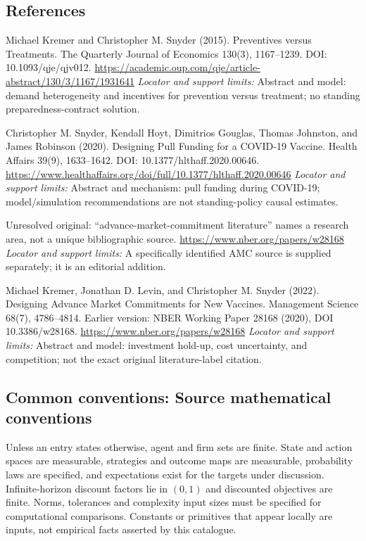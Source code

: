 \documentclass[11pt,a4paper]{article}
\begin{document}
\subsection*{References}
\begin{enumerate}[label={[S\arabic*]},leftmargin=*,itemsep=0.6em]
\item Michael Kremer and Christopher M. Snyder (2015). Preventives versus Treatments. The Quarterly Journal of Economics 130(3), 1167--1239. DOI: 10.1093/qje/qjv012.
\url{https://academic.oup.com/qje/article-abstract/130/3/1167/1931641}
\newline\emph{Locator and support limits:} Abstract and model: demand heterogeneity and incentives for prevention versus treatment; no standing preparedness-contract solution.
\item Christopher M. Snyder, Kendall Hoyt, Dimitrios Gouglas, Thomas Johnston, and James Robinson (2020). Designing Pull Funding for a COVID-19 Vaccine. Health Affairs 39(9), 1633--1642. DOI: 10.1377/hlthaff.2020.00646.
\url{https://www.healthaffairs.org/doi/full/10.1377/hlthaff.2020.00646}
\newline\emph{Locator and support limits:} Abstract and mechanism: pull funding during COVID-19; model/simulation recommendations are not standing-policy causal estimates.
\item Unresolved original: “advance-market-commitment literature” names a research area, not a unique bibliographic source.
\url{https://www.nber.org/papers/w28168}
\newline\emph{Locator and support limits:} A specifically identified AMC source is supplied separately; it is an editorial addition.
\item Michael Kremer, Jonathan D. Levin, and Christopher M. Snyder (2022). Designing Advance Market Commitments for New Vaccines. Management Science 68(7), 4786--4814. Earlier version: NBER Working Paper 28168 (2020), DOI 10.3386/w28168.
\url{https://www.nber.org/papers/w28168}
\newline\emph{Locator and support limits:} Abstract and model: investment hold-up, cost uncertainty, and competition; not the exact original literature-label citation.
\end{enumerate}

\subsection*{Common conventions: Source mathematical conventions}

Unless an entry states otherwise, agent and firm sets are finite. State and action spaces are measurable, strategies and outcome maps are measurable, probability laws are specified, and expectations exist for the targets under discussion. Infinite-horizon discount factors lie in $(0,1)$ and discounted objectives are finite. Norms, tolerances and complexity input sizes must be specified for computational comparisons. Constants or primitives that appear locally are inputs, not empirical facts asserted by this catalogue.
\end{document}
